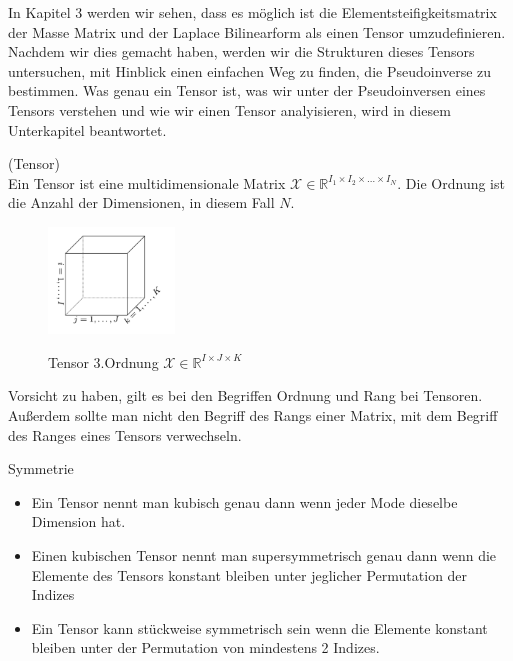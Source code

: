 In Kapitel 3 werden wir sehen, dass es möglich ist die Elementsteifigkeitsmatrix der Masse Matrix und der Laplace Bilinearform als einen Tensor umzudefinieren. Nachdem wir dies gemacht haben, werden wir die Strukturen dieses Tensors untersuchen, mit Hinblick einen einfachen Weg zu finden, die Pseudoinverse zu bestimmen. Was genau ein Tensor ist, was wir unter der Pseudoinversen eines Tensors verstehen und wie wir einen Tensor analyisieren, wird in diesem Unterkapitel beantwortet.


\begin{Definition} (Tensor) \\
Ein Tensor ist eine multidimensionale Matrix $\pmb{\mathscr{X}}  \in \mathbb{R}^{I_1 \times I_2 \times \dots \times I_N}$.
Die Ordnung ist die Anzahl der Dimensionen, in diesem Fall $N$.
\end{Definition}

\begin{figure}[ht]
	\centering
  \includegraphics[width=0.3\textwidth]{tensorOrdnung3.png}
	\caption{Tensor 3.Ordnung $\pmb{\mathscr{X}}  \in \mathbb{R}^{I \times J \times K}$} \cite[456]{Kolda}
	\label{fig:tensorOrdnung3}
\end{figure}

Vorsicht zu haben, gilt es bei den Begriffen Ordnung und Rang bei Tensoren. Außerdem sollte man nicht den Begriff des Rangs einer Matrix, mit dem Begriff des Ranges eines Tensors verwechseln. 


\begin{Bemerkung} Symmetrie \\
\begin{itemize}
\item Ein Tensor nennt man kubisch genau dann wenn jeder Mode dieselbe Dimension hat. 
\item Einen kubischen Tensor nennt man supersymmetrisch genau dann wenn die Elemente des Tensors konstant bleiben unter jeglicher Permutation der Indizes
\item Ein Tensor kann stückweise symmetrisch sein wenn die Elemente konstant bleiben unter der Permutation von mindestens 2 Indizes.
\end{itemize}
\end{Bemerkung}

